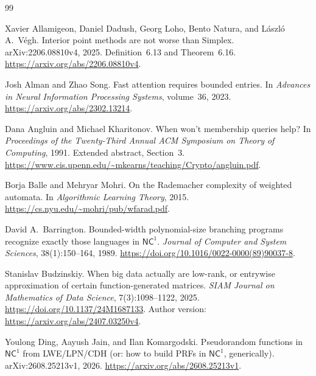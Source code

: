 \documentclass[11pt]{article}
\theoremstyle{definition}
\theoremstyle{remark}
\begin{document}
\makeatletter\def\UrlBigBreaks{\do@url@hyp}\g@addto@macro\UrlNoBreaks{\do\:}\makeatother
\begin{thebibliography}{99}

Xavier Allamigeon, Daniel Dadush, Georg Loho, Bento Natura, and L{\'a}szl{\'o} A.~V{\'e}gh.
\newblock Interior point methods are not worse than Simplex.
\newblock arXiv:2206.08810v4, 2025. Definition~6.13 and Theorem~6.16.
\newblock \url{https://arxiv.org/abs/2206.08810v4}.

Josh Alman and Zhao Song.
\newblock Fast attention requires bounded entries.
\newblock In \emph{Advances in Neural Information Processing Systems}, volume~36, 2023.
\newblock \url{https://arxiv.org/abs/2302.13214}.

Dana Angluin and Michael Kharitonov.
\newblock When won't membership queries help?
\newblock In \emph{Proceedings of the Twenty-Third Annual ACM Symposium on Theory of Computing}, 1991. Extended abstract, Section~3.
\newblock \url{https://www.cis.upenn.edu/~mkearns/teaching/Crypto/angluin.pdf}.

Borja Balle and Mehryar Mohri.
\newblock On the Rademacher complexity of weighted automata.
\newblock In \emph{Algorithmic Learning Theory}, 2015.
\newblock \url{https://cs.nyu.edu/~mohri/pub/wfarad.pdf}.

David A.~Barrington.
\newblock Bounded-width polynomial-size branching programs recognize exactly those languages in $\mathsf{NC}^1$.
\newblock \emph{Journal of Computer and System Sciences}, 38(1):150--164, 1989.
\newblock \url{https://doi.org/10.1016/0022-0000(89)90037-8}.

Stanislav Budzinskiy.
\newblock When big data actually are low-rank, or entrywise approximation of certain function-generated matrices.
\newblock \emph{SIAM Journal on Mathematics of Data Science}, 7(3):1098--1122, 2025.
\newblock \url{https://doi.org/10.1137/24M1687133}.
\newblock Author version: \url{https://arxiv.org/abs/2407.03250v4}.

Youlong Ding, Aayush Jain, and Ilan Komargodski.
\newblock Pseudorandom functions in $\mathsf{NC}^1$ from LWE/LPN/CDH (or: how to build PRFs in $\mathsf{NC}^1$, generically).
\newblock arXiv:2608.25213v1, 2026.
\newblock \url{https://arxiv.org/abs/2608.25213v1}.


\end{thebibliography}
\end{document}
